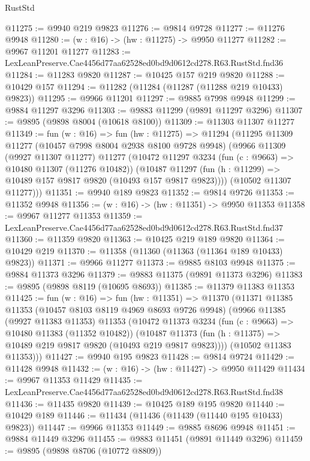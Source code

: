 \begin{lexlean}{RustStd}
\begin{coremodule}
@11275 := @9940 @219 @9823
@11276 := @9814 @9728
@11277 := @11276 @9948
@11280 := (w : @16) -> (hw : @11275) -> @9950 @11277
@11282 := @9967 @11201 @11277
@11283 := LexLeanPreserve.Cae4456d77aa62528ed0bd9d0612cd278.R63.RustStd.fnd36
@11284 := @11283 @9820
@11287 := @10425 @157 @219 @9820
@11288 := @10429 @157
@11294 := @11282 (@11284 (@11287 (@11288 @219 @10433) @9823))
@11295 := @9966 @11201
@11297 := @9885 @7998 @9948
@11299 := @9884 @11297 @3296
@11303 := @9883 @11299 (@9891 @11297 @3296)
@11307 := @9895 (@9898 @8004 (@10618 @8100))
@11309 := @11303 @11307 @11277
@11349 := fun (w : @16) =>
  fun (hw : @11275) =>
  @11294
    (@11295
      @11309
      @11277
      (@10457 @7998 @8004 @2938 @8100 @9728 @9948)
      (@9966
        @11309
        (@9927 @11307 @11277)
        @11277
        (@10472
          @11297
          @3234
          (fun (c : @9663) => @10480 @11307 (@11276 @10482))
          (@10487 @11297 (fun (h : @11299) => @10489 @157 @9817 @9820 (@10493 @157 @9817 @9823))))
        (@10502 @11307 @11277)))
@11351 := @9940 @189 @9823
@11352 := @9814 @9726
@11353 := @11352 @9948
@11356 := (w : @16) -> (hw : @11351) -> @9950 @11353
@11358 := @9967 @11277 @11353
@11359 := LexLeanPreserve.Cae4456d77aa62528ed0bd9d0612cd278.R63.RustStd.fnd37
@11360 := @11359 @9820
@11363 := @10425 @219 @189 @9820
@11364 := @10429 @219
@11370 := @11358 (@11360 (@11363 (@11364 @189 @10433) @9823))
@11371 := @9966 @11277
@11373 := @9885 @8103 @9948
@11375 := @9884 @11373 @3296
@11379 := @9883 @11375 (@9891 @11373 @3296)
@11383 := @9895 (@9898 @8119 (@10695 @8693))
@11385 := @11379 @11383 @11353
@11425 := fun (w : @16) =>
  fun (hw : @11351) =>
  @11370
    (@11371
      @11385
      @11353
      (@10457 @8103 @8119 @4969 @8693 @9726 @9948)
      (@9966
        @11385
        (@9927 @11383 @11353)
        @11353
        (@10472
          @11373
          @3234
          (fun (c : @9663) => @10480 @11383 (@11352 @10482))
          (@10487 @11373 (fun (h : @11375) => @10489 @219 @9817 @9820 (@10493 @219 @9817 @9823))))
        (@10502 @11383 @11353)))
@11427 := @9940 @195 @9823
@11428 := @9814 @9724
@11429 := @11428 @9948
@11432 := (w : @16) -> (hw : @11427) -> @9950 @11429
@11434 := @9967 @11353 @11429
@11435 := LexLeanPreserve.Cae4456d77aa62528ed0bd9d0612cd278.R63.RustStd.fnd38
@11436 := @11435 @9820
@11439 := @10425 @189 @195 @9820
@11440 := @10429 @189
@11446 := @11434 (@11436 (@11439 (@11440 @195 @10433) @9823))
@11447 := @9966 @11353
@11449 := @9885 @8696 @9948
@11451 := @9884 @11449 @3296
@11455 := @9883 @11451 (@9891 @11449 @3296)
@11459 := @9895 (@9898 @8706 (@10772 @8809))

\end{coremodule}
\end{lexlean}
